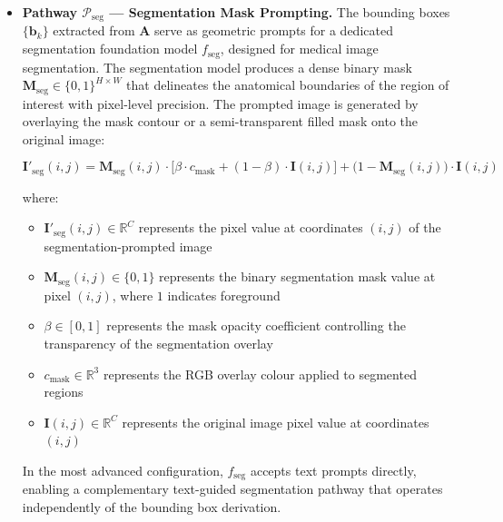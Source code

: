 \begin{itemize}
    An optional anatomical body mask $\mathbf{M}_{\text{body}}$, computed via Otsu thresholding followed by morphological closing, suppresses attention activation in non-anatomical regions (e.g., textual annotations or imaging artefacts in the periphery of the radiograph).

    \item \textbf{Pathway $\mathcal{P}_{\text{seg}}$ --- Segmentation Mask Prompting.} The bounding boxes $\{\mathbf{b}_k\}$ extracted from $\mathbf{A}$ serve as geometric prompts for a dedicated segmentation foundation model $f_{\text{seg}}$, designed for medical image segmentation. The segmentation model produces a dense binary mask $\mathbf{M}_{\text{seg}} \in \{0, 1\}^{H \times W}$ that delineates the anatomical boundaries of the region of interest with pixel-level precision. The prompted image is generated by overlaying the mask contour or a semi-transparent filled mask onto the original image:

    \[
    \mathbf{I}'_{\text{seg}}(i,j) = \mathbf{M}_{\text{seg}}(i,j) \cdot \bigl[\beta \cdot c_{\text{mask}} + (1 - \beta) \cdot \mathbf{I}(i,j)\bigr] + \bigl(1 - \mathbf{M}_{\text{seg}}(i,j)\bigr) \cdot \mathbf{I}(i,j)
    \]

    where:
    \begin{itemize}
    \item $\mathbf{I}'_{\text{seg}}(i,j) \in \mathbb{R}^C$ represents the pixel value at coordinates $(i,j)$ of the segmentation-prompted image
    \item $\mathbf{M}_{\text{seg}}(i,j) \in \{0, 1\}$ represents the binary segmentation mask value at pixel $(i,j)$, where $1$ indicates foreground
    \item $\beta \in [0, 1]$ represents the mask opacity coefficient controlling the transparency of the segmentation overlay
    \item $c_{\text{mask}} \in \mathbb{R}^3$ represents the RGB overlay colour applied to segmented regions
    \item $\mathbf{I}(i,j) \in \mathbb{R}^C$ represents the original image pixel value at coordinates $(i,j)$
    \end{itemize}

    In the most advanced configuration, $f_{\text{seg}}$ accepts text prompts directly, enabling a complementary text-guided segmentation pathway that operates independently of the bounding box derivation.

\end{itemize}

